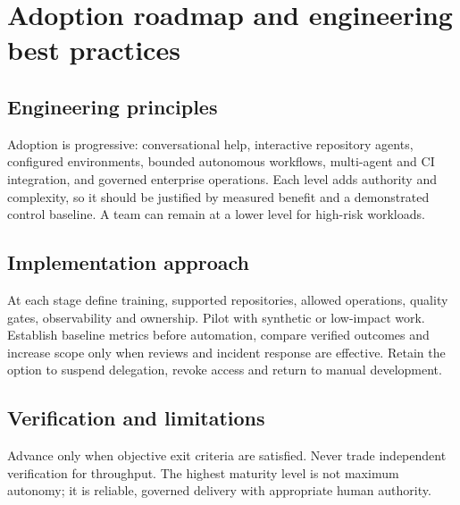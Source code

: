 \chapter{Adoption roadmap and engineering best practices}

\section{Engineering principles}

Adoption is progressive: conversational help, interactive repository agents, configured environments, bounded autonomous workflows, multi-agent and CI integration, and governed enterprise operations. Each level adds authority and complexity, so it should be justified by measured benefit and a demonstrated control baseline. A team can remain at a lower level for high-risk workloads.

\section{Implementation approach}

At each stage define training, supported repositories, allowed operations, quality gates, observability and ownership. Pilot with synthetic or low-impact work. Establish baseline metrics before automation, compare verified outcomes and increase scope only when reviews and incident response are effective. Retain the option to suspend delegation, revoke access and return to manual development.

\section{Verification and limitations}

Advance only when objective exit criteria are satisfied. Never trade independent verification for throughput. The highest maturity level is not maximum autonomy; it is reliable, governed delivery with appropriate human authority.


